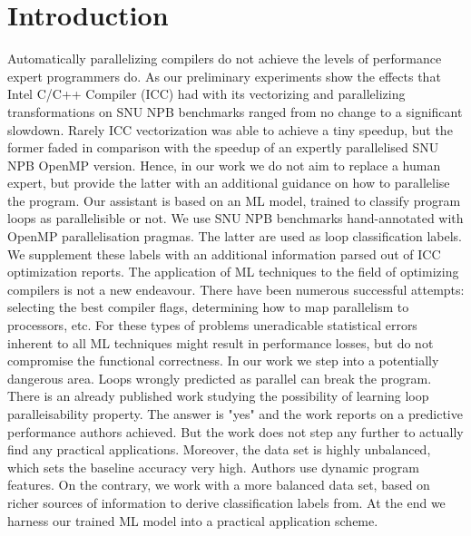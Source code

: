 \documentclass{acaces}
\begin{document}
\section{Introduction}
\quad Automatically parallelizing compilers do not achieve the levels of performance expert programmers do. As our preliminary experiments show the effects that Intel C/C++ Compiler (ICC) had with its vectorizing and parallelizing transformations on SNU NPB benchmarks \cite{snu-npb-benchmarks} ranged from no change to a significant slowdown. Rarely ICC vectorization was able to achieve a tiny speedup, but the former faded in comparison with the speedup of an expertly parallelised SNU NPB OpenMP version. Hence, in our work we do not aim to replace a human expert, but provide the latter with an additional guidance on how to parallelise the program.\newline\null
\quad Our assistant is based on an ML model, trained to classify program loops as parallelisible or not. We use SNU NPB benchmarks hand-annotated with OpenMP parallelisation pragmas. The latter are used as loop classification labels. We supplement these labels with an additional information parsed out of ICC optimization reports.\newline\null
\quad The application of ML techniques to the field of optimizing compilers is not a new endeavour. There have been numerous successful attempts: selecting the best compiler flags, determining how to map parallelism to processors, etc. For these types of problems uneradicable statistical errors inherent to all ML techniques might result in performance losses, but do not compromise the functional correctness. In our work we step into a potentially dangerous area. Loops wrongly predicted as parallel can break the program. There is an already published work \cite{fried_ea:2013:icmla} studying the possibility of learning loop paralleisability property. The answer is "yes" and the work reports on a predictive performance authors achieved. But the work does not step any further to actually find any practical applications. Moreover, the data set is highly unbalanced, which sets the baseline accuracy very high. Authors use dynamic program features.\newline\null
\quad On the contrary, we work with a more balanced data set, based on richer sources of information to derive classification labels from. At the end we harness our trained ML model into a practical application scheme.
\end{document}
